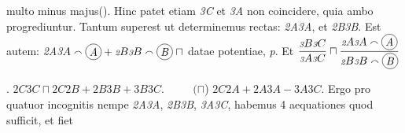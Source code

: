 %
multo minus majus\protect\vphantom(). Hinc patet etiam \textit{\scriptsize 3}\textit{C} et \textit{\scriptsize 3}\textit{A} non coincidere, quia ambo progrediuntur.
%
Tantum superest ut determinemus rectas: \textit{\scriptsize 2}\textit{A}\textit{\scriptsize 3}\textit{A}, et \textit{\scriptsize 2}\textit{B}\textit{\scriptsize 3}\textit{B}. \pend
%
\pstart\noindent
Est autem: 
%
\textit{\scriptsize 2}\textit{A}\textit{\scriptsize 3}$A \smallfrown \raisebox{-1.0ex}{\begin{tikzpicture}\draw (0,0) circle (0.25cm) node {\textit{A}};\end{tikzpicture}}%
+ {\scriptstyle \textit{2}}B{\scriptstyle \textit{3}}B \smallfrown \raisebox{-1.0ex}{\begin{tikzpicture}\draw (0,0) circle (0.25cm) node {\textit{B}};\end{tikzpicture}}\; \sqcap$ datae potentiae, \textit{p}. \pend
%
\pstart\noindent
%
Et $\displaystyle\frac{{\scriptstyle \textit{3}}B{\scriptstyle \textit{3}}C}{{\scriptstyle \textit{3}}A{\scriptstyle \textit{3}}C} \sqcap \displaystyle\frac{{\scriptstyle \textit{2}}A{\scriptstyle \textit{3}}A \smallfrown\raisebox{-1.0ex}{\begin{tikzpicture}\draw (0,0) circle (0.25cm) node {\textit{A}};\end{tikzpicture}}}{{\scriptstyle \textit{2}}B{\scriptstyle \textit{3}}B \smallfrown \raisebox{-1.0ex}{\begin{tikzpicture}\draw (0,0) circle (0.25cm) node {\textit{B}};\end{tikzpicture}}}$\rule[-8mm]{0pt}{15mm}.\pend
%
\pstart\noindent
%
${\scriptstyle \textit{2}}C{\scriptstyle \textit{3}}C \sqcap {\scriptstyle \textit{2}}C{\scriptstyle \textit{2}}B+{\scriptstyle \textit{2}}B{\scriptstyle \textit{3}}B+{\scriptstyle \textit{3}}B{\scriptstyle \textit{3}}C$.\pend
%
\pstart\noindent
$\phantom{\;{\scriptstyle \textit{2}}C{\scriptstyle \textit{3}}\;} (\sqcap$) ${\scriptstyle \textit{2}}C{\scriptstyle \textit{2}}A+{\scriptstyle \textit{2}}A{\scriptstyle \textit{3}}A-{\scriptstyle \textit{3}}A{\scriptstyle \textit{3}}C$. 
\pend
%
\pstart\noindent
Ergo pro quatuor incognitis nempe \textit{{\scriptsize 2}A{\scriptsize 3}A}, \textit{{\scriptsize 2}B{\scriptsize 3}B},
%
%
\textit{{\scriptsize 3}A{\scriptsize 3}C},
habemus 4 aequationes quod sufficit, et fiet
\pend
%
\pstart\noindent

